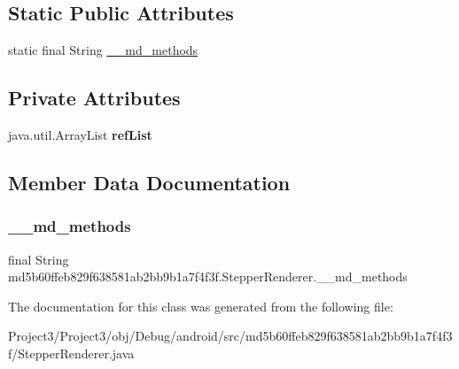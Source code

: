 \subsection*{Static Public Attributes}
\begin{DoxyCompactItemize}
\item 
static final String \hyperlink{classmd5b60ffeb829f638581ab2bb9b1a7f4f3f_1_1StepperRenderer_ae75360821f2ab13475b89986650b0f66}{\+\_\+\+\_\+md\+\_\+methods}
\end{DoxyCompactItemize}
\subsection*{Private Attributes}
\begin{DoxyCompactItemize}
\item 
\mbox{\label{classmd5b60ffeb829f638581ab2bb9b1a7f4f3f_1_1StepperRenderer_a35d2d1141b611523dcf58cee9210fd42}} 
java.\+util.\+Array\+List {\bfseries ref\+List}
\end{DoxyCompactItemize}


\subsection{Member Data Documentation}
\mbox{\label{classmd5b60ffeb829f638581ab2bb9b1a7f4f3f_1_1StepperRenderer_ae75360821f2ab13475b89986650b0f66}} 
\subsubsection{\texorpdfstring{\+\_\+\+\_\+md\+\_\+methods}{\_\_md\_methods}}
{\footnotesize\ttfamily final String md5b60ffeb829f638581ab2bb9b1a7f4f3f.\+Stepper\+Renderer.\+\_\+\+\_\+md\+\_\+methods\hspace{0.3cm}{\ttfamily [static]}}



The documentation for this class was generated from the following file\+:\begin{DoxyCompactItemize}
\item 
Project3/\+Project3/obj/\+Debug/android/src/md5b60ffeb829f638581ab2bb9b1a7f4f3f/Stepper\+Renderer.\+java\end{DoxyCompactItemize}
